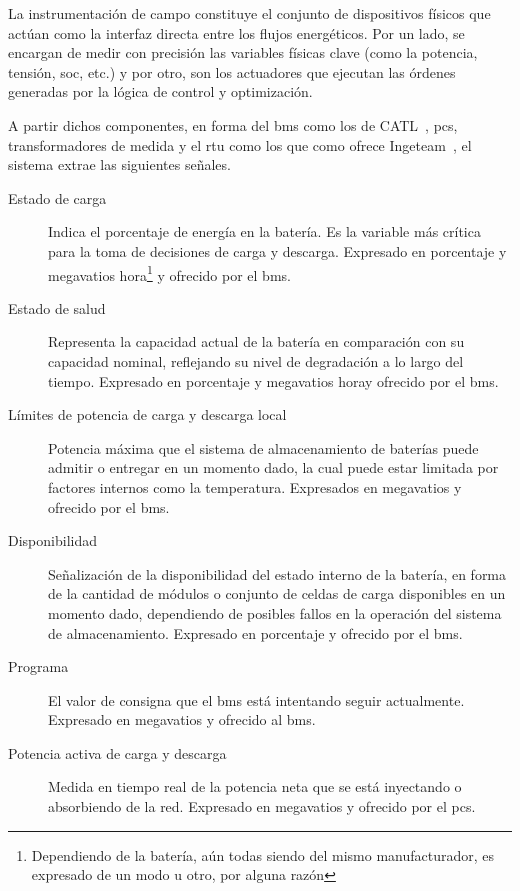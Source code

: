La instrumentación de campo constituye el conjunto de dispositivos físicos que actúan como la interfaz directa entre los flujos energéticos. Por un lado, se encargan de medir con precisión las variables físicas clave (como la potencia, tensión, \gls{soc}, etc.) y por otro, son los actuadores que ejecutan las órdenes generadas por la lógica de control y optimización.

A partir dichos componentes, en forma del \gls{bms} como los de CATL~\cite{catl2023catl}, \gls{pcs}, transformadores de medida y el \gls{rtu} como los que como ofrece Ingeteam~\cite{ingeteam2025ingeteam}, el sistema extrae las siguientes señales.

\begin{description}

  \item[Estado de carga] Indica el porcentaje de energía en la batería. Es la variable más crítica para la toma de decisiones de carga y descarga. Expresado en porcentaje y megavatios hora\footnote{Dependiendo de la batería, aún todas siendo del mismo manufacturador, es expresado de un modo u otro, por alguna razón} y ofrecido por el \gls{bms}.

  \item[Estado de salud] Representa la capacidad actual de la batería en comparación con su capacidad nominal, reflejando su nivel de degradación a lo largo del tiempo. Expresado en porcentaje y megavatios hora\footnotemark[\value{footnote}] y ofrecido por el \gls{bms}.

  \item[Límites de potencia de carga y descarga local] Potencia máxima que el sistema de almacenamiento de baterías puede admitir o entregar en un momento dado, la cual puede estar limitada por factores internos como la temperatura. Expresados en megavatios y ofrecido por el \gls{bms}.

  \item[Disponibilidad] Señalización de la disponibilidad del estado interno de la batería, en forma de la cantidad de módulos o conjunto de celdas de carga disponibles en un momento dado, dependiendo de posibles fallos en la operación del sistema de almacenamiento. Expresado en porcentaje y ofrecido por el \gls{bms}.

  \item[Programa] El valor de consigna que el \gls{bms} está intentando seguir actualmente. Expresado en megavatios y ofrecido al \gls{bms}.

  \item[Potencia activa de carga y descarga] Medida en tiempo real de la potencia neta que se está inyectando o absorbiendo de la red. Expresado en megavatios y ofrecido por el \gls{pcs}.


\end{description}
